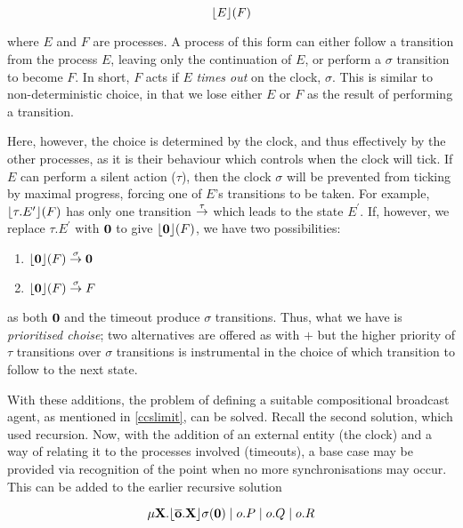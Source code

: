 \begin{equation}
\lfloor{E}\rfloor({F})
\end{equation}

\noindent where $E$ and $F$ are processes.  A process of this form can
either follow a transition from the process $E$, leaving only the
continuation of $E$, or perform a $\sigma$ transition to become $F$.
In short, $F$ acts if $E$ \emph{times out} on the clock, $\sigma$.
This is similar to non-deterministic choice, in that we lose either
$E$ or $F$ as the result of performing a transition.

Here, however, the choice is determined by the clock, and thus
effectively by the other processes, as it is their behaviour which
controls when the clock will tick.  If $E$ can perform a silent action
($\tau$), then the clock $\sigma$ will be prevented from ticking by
maximal progress, forcing one of $E$'s transitions to be taken.  For
example, $\lfloor{\tau.E^\prime}\rfloor({F})$ has only one transition
$\stackrel{\tau}{\rightarrow}$ which leads to the state $E^\prime$.  If, however, we
replace $\tau.E^\prime$ with $\textbf{0}$ to give
$\lfloor{\textbf{0}}\rfloor({F})$, we have two possibilities:

\begin{enumerate}
\item $\lfloor{\textbf{0}}\rfloor({F}) \stackrel{\sigma}{\rightarrow} \textbf{0}$
\item $\lfloor{\textbf{0}}\rfloor({F}) \stackrel{\sigma}{\rightarrow} F$
\end{enumerate}

\noindent as both $\textbf{0}$ and the timeout produce $\sigma$ transitions.
Thus, what we have is \emph{prioritised choise}; two alternatives are
offered as with $+$ but the higher priority of $\tau$ transitions over
$\sigma$ transitions is instrumental in the choice of which transition
to follow to the next state.

With these additions, the problem of defining a suitable compositional
broadcast agent, as mentioned in \ref{ccslimit}, can be solved.
Recall the second solution, which used recursion.  Now, with the
addition of an external entity (the clock) and a way of relating it to
the processes involved (timeouts), a base case may be provided via
recognition of the point when no more synchronisations may occur.
This can be added to the earlier recursive solution

\begin{equation}
\mathbf{\mu X.\lfloor{\overline{o}.X}\rfloor {\sigma} ({0})} \;|\; o.P \;|\; o.Q \;|\; o.R
\end{equation}

